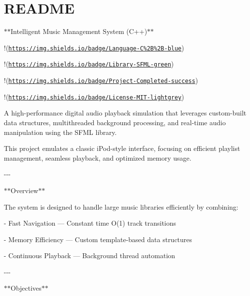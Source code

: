 \chapter{README }
\hypertarget{md__r_e_a_d_m_e}{}\label{md__r_e_a_d_m_e}
\texorpdfstring{$\ast$}{*}\texorpdfstring{$\ast$}{*}\+Intelligent  Music Management System (C++)\texorpdfstring{$\ast$}{*}\texorpdfstring{$\ast$}{*}

!\+[C++]\+(\href{https://img.shields.io/badge/Language-C\%2B\%2B-blue}{\texttt{https:\+/\+/\+img.\+shields.\+io/\+badge/\+\+Language-\/\+C\%2\+B\%2\+B-\/blue}})

!\+[SFML]\+(\href{https://img.shields.io/badge/Library-SFML-green}{\texttt{https:\+/\+/\+img.\+shields.\+io/\+badge/\+\+Library-\/\+SFML-\/green}})

!\+[Status]\+(\href{https://img.shields.io/badge/Project-Completed-success}{\texttt{https:\+/\+/\+img.\+shields.\+io/\+badge/\+\+Project-\/\+Completed-\/success}})

!\+[License]\+(\href{https://img.shields.io/badge/License-MIT-lightgrey}{\texttt{https:\+/\+/\+img.\+shields.\+io/\+badge/\+\+License-\/\+MIT-\/lightgrey}})

A high-\/performance digital audio playback simulation that leverages custom-\/built data structures, multithreaded background processing, and real-\/time audio manipulation using the SFML library.

This project emulates a classic i\+Pod-\/style interface, focusing on efficient playlist management, seamless playback, and optimized memory usage.

-\/-\/-\/

\texorpdfstring{$\ast$}{*}\texorpdfstring{$\ast$}{*}\+Overview\texorpdfstring{$\ast$}{*}\texorpdfstring{$\ast$}{*}

The system is designed to handle large music libraries efficiently by combining:\+

-\/ Fast Navigation — Constant time O(1) track transitions ~\newline


-\/ Memory Efficiency — Custom template-\/based data structures ~\newline


-\/ Continuous Playback — Background thread automation ~\newline


-\/-\/-\/

\texorpdfstring{$\ast$}{*}\texorpdfstring{$\ast$}{*}\+Objectives\texorpdfstring{$\ast$}{*}\texorpdfstring{$\ast$}{*}

